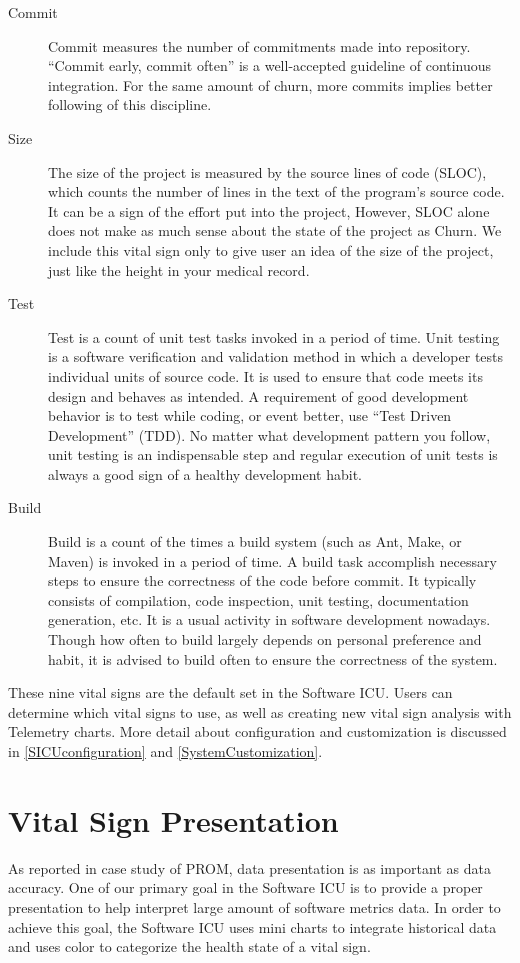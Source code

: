 \begin{description}
\item[Commit] 
Commit measures the number of commitments made into repository. ``Commit early, commit often'' is a well-accepted guideline of continuous integration. For the same amount of churn, more commits implies better following of this discipline.

\item[Size] 
The size of the project is measured by the source lines of code (SLOC), which counts the number of lines in the text of the program's source code. It can be a sign of the effort put into the project, However, SLOC alone does not make as much sense about the state of the project as Churn. We include this vital sign only to give user an idea of the size of the project, just like the height in your medical record.

\item[Test] 
Test is a count of unit test tasks invoked in a period of time. Unit testing is a software verification and validation method in which a developer tests individual units of source code. It is used to ensure that code meets its design and behaves as intended. A requirement of good development behavior is to test while coding, or event better, use ``Test Driven Development'' (TDD). No matter what development pattern you follow, unit testing is an indispensable step and regular execution of unit tests is always a good sign of a healthy development habit.

\item[Build] 
Build is a count of the times a build system (such as Ant, Make, or Maven) is invoked in a period of time. A build task accomplish necessary steps to ensure the correctness of the code before commit. It typically consists of compilation, code inspection, unit testing, documentation generation, etc. It is a usual activity in software development nowadays. Though how often to build largely depends on personal preference and habit, it is advised to build often to ensure the correctness of the system.

\end{description}

These nine vital signs are the default set in the Software ICU. Users can determine which vital signs to use, as well as creating new vital sign analysis with Telemetry charts. More detail about configuration and customization is discussed in \autoref{SICUconfiguration} and \autoref{SystemCustomization}.

\section{Vital Sign Presentation}
\label{presentation}
As reported in case study of PROM, data presentation is as important as data accuracy\cite{prom09}. One of our primary goal in the Software ICU is to provide a proper presentation to help interpret large amount of software metrics data. In order to achieve this goal, the Software ICU uses mini charts to integrate historical data and uses color to categorize the health state of a vital sign.

